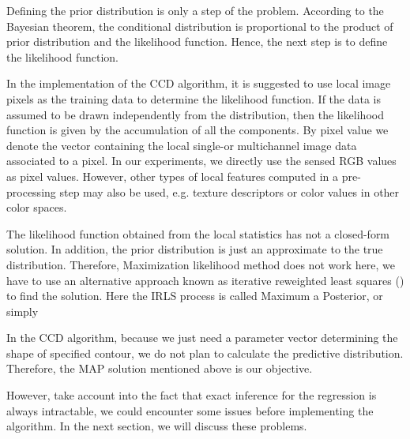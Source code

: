 Defining the prior distribution is only a step of the problem.
According to the Bayesian theorem, the conditional distribution
is proportional to the product of prior distribution and the likelihood
function. Hence, the next step is to define the likelihood function.

In the implementation of the CCD algorithm, it is suggested to use
local image pixels as the training data to determine the
likelihood function. If the data is assumed to be drawn  independently
from the distribution, then the likelihood function is given by the accumulation of all the components.
By pixel value we denote the vector containing the local single-or multichannel
image data associated to a pixel. In our experiments, we directly use the sensed RGB
values as pixel values. However, other types of local features computed in a pre-processing
step may also be used, e.g. texture descriptors or color values in
other color spaces.

The likelihood function obtained from the local statistics has
not a closed-form solution. In addition, the prior distribution is just
an approximate to the true distribution. Therefore, Maximization
likelihood method does not work here, we have to use an alternative
approach known as iterative reweighted least squares () to find
the solution. Here the IRLS process is called Maximum a Posterior, or
simply 

In the CCD algorithm, because we just need a parameter vector determining
the shape of specified contour, we do not plan to calculate the
predictive distribution. Therefore, the MAP solution mentioned above
is our objective.

However, take account into the fact that exact inference for the
regression is always intractable, we could encounter some issues before
implementing the algorithm. In the next section, we will discuss these
problems.


